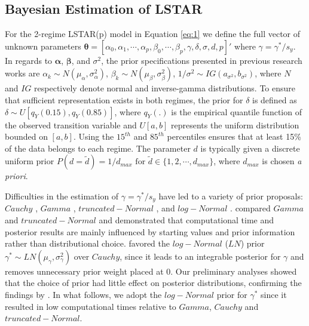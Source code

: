 \subsection{Bayesian Estimation of LSTAR}
 For the 2-regime LSTAR(p) model in Equation \ref{eq:1} we define the full vector of unknown parameters $\bm{\theta}=[\alpha_0, \alpha_1, \cdots, \alpha_p, \beta_0,\cdots,\beta_p, \gamma,\delta,\sigma,d,p]'$ where $\gamma=\gamma^*/s_y$. In regards to $\bm{\alpha}$, $\bm{\beta}$, and $\sigma^2$, the prior specifications presented in previous research works are  $\alpha_k \sim N(\mu_\alpha,\sigma^2_\alpha)$, $\beta_k \sim N(\mu_\beta,\sigma^2_\beta)$, $1/\sigma^2 \sim IG(a_{\sigma^2},b_{\sigma^2})$, where $N$ and $IG$ respectively denote normal and inverse-gamma distributions. To ensure that sufficient representation exists in both regimes, the prior for $\delta$ is defined as $\delta \sim U[q_Y(0.15),q_Y(0.85)]$, where $q_Y(.)$ is the empirical quantile function of the observed transition variable and $U[a,b]$ represents the uniform distribution bounded on  $[a,b]$. Using the $15^{th}$ and $85^{th}$ percentiles ensures that at least 15\% of the data belongs to each regime. The parameter $d$ is typically given a discrete uniform prior $P(d=\tilde{d})=1/d_{max} \textrm{ for } \tilde{d} \in \{1,2,\cdots,d_{max}\}$, where $d_{max}$ is chosen \textit{a priori}.
 
Difficulties in the estimation of $\gamma=\gamma^*/s_y$ have led to a variety of prior proposals: $Cauchy$ \citep{Lubrano2000},  $Gamma$ \citep{Lopes2006}, $truncated-Normal$ \citep{Livingston2017}, and $log-Normal$ \citep{Gerlach2008}.  \cite{Livingston2017} compared  $Gamma$ and $truncated-Normal$ and demonstrated that computational time and posterior results are mainly influenced by starting values and prior information rather than distributional choice. \cite{Gerlach2008} favored the $log-Normal$ ($LN$) prior $\gamma^* \sim LN(\mu_\gamma,\sigma^2_\gamma)$ over $Cauchy$, since it leads to an integrable posterior for $\gamma$ and removes unnecessary prior weight placed at 0. Our preliminary analyses showed that the choice of prior had little effect on posterior distributions, confirming the findings by \cite{Livingston2017}. In what follows, we adopt the $log-Normal$ prior for $\gamma^*$ since it resulted in low computational times relative to $Gamma$, $Cauchy$ and $truncated-Normal$.
 
